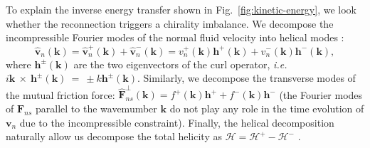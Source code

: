 \documentclass[%
 reprint,
 amsmath,amssymb,
 aps,
 prl,
]{revtex4-2}
\def \k{\mathbf{k}}
\def \h{\mathbf{h}}
\newcommand*{\NOTE}[1]{\textbf{\color{red}[#1]}}
\begin{document}
{To explain the inverse energy transfer shown in Fig.~\ref{fig:kinetic-energy},
we look whether the reconnection triggers a chirality imbalance. 
We decompose the incompressible Fourier modes of the normal fluid velocity 
into helical modes \cite{waleffe-1992}:
\begin{equation}
\hat{\mathbf{v}}_n (\k) = \hat{\mathbf{v}}_n^+(\k) +\hat{\mathbf{v}}_n^-(\k)=
 v_n^+(\mathbf{k}) \mathbf{h}^+(\mathbf{k})+v_n^-(\mathbf{k}) \mathbf{h}^-(\mathbf{k}),
\end{equation}
%
where $\mathbf{h}^\pm (\mathbf{k})$ are the two eigenvectors of the curl 
operator, \textit{i.e.} $i\k~\times~\h^{\pm}(\k)~=~\pm k \h^{\pm}(\k)$. 
Similarly, we decompose the transverse modes of the mutual friction force:
$\hat{\mathbf{F}}_{ns}^{\perp}(\k) = f^+(\k) \mathbf{h}^+ + f^-(\k) \mathbf{h}^-$
(the  Fourier modes of $\mathbf{F}_{ns}$ parallel to the wavemumber 
$\k$ do not play any role in the time evolution of $\mathbf{v}_n$ 
due to the incompressible constraint). Finally, the helical decomposition naturally allow us decompose the total helicity as $\mathcal{H}=\mathcal{H}^+-\mathcal{H}^-$ \cite{plunianInverseCascadeEnergy2020a}.

}
\end{document}

